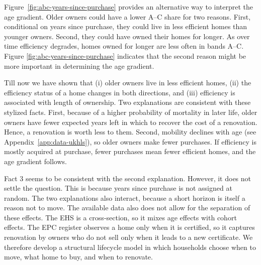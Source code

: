 Figure~\ref{fig:abc-years-since-purchase} provides an alternative way to interpret
the age gradient. Older owners could have a lower A--C share for two
reasons. First, conditional on years since purchase, they could live in less efficient homes than younger owners. Second,  they could have owned
their homes for longer. As over time efficiency degrades, homes owned for longer are less often in bands A--C. Figure \ref{fig:abc-years-since-purchase} indicates that the second reason might be more important in determining the age gradient.



Till now we have shown that (i) older owners live in less
efficient homes, (ii) the efficiency status of a home changes in both
directions, and (iii) efficiency is associated with length of ownership. Two explanations are consistent with these stylized facts. First, because of a higher probability of mortality in later life, older owners have
fewer expected years left in which to recover the cost of a renovation. Hence, a
renovation is worth less to them. Second, mobility declines with age (see Appendix~\ref{app:data-ukhls}), so
older owners make fewer purchases.  If
    efficiency is mostly acquired at purchase, fewer purchases mean fewer
    efficient homes, and the age gradient follows.

Fact 3 seems to be  consistent with the second explanation. However, it does not settle the question. This is because years since purchase is not assigned at random.
The two explanations also interact, because a short horizon is itself a
reason not to move. The available data also does not allow for the separation of these effects. The EHS is a cross-section, so it mixes age effects with cohort effects. The EPC register observes a home only when it is certified, so it captures renovation by owners who do not sell only when it leads to a new certificate.  We therefore develop a structural lifecycle model in which households choose when to move, what home to buy, and when to renovate.

